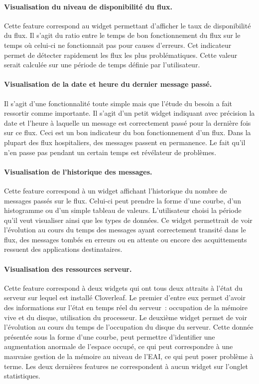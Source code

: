 			\paragraph{Visualisation du niveau de disponibilité du flux.}
			Cette feature correspond au widget permettant d'afficher le taux de
			disponibilité du flux. Il s'agit du ratio entre le temps de bon
			fonctionnement du flux sur le temps où celui-ci ne fonctionnait pas pour
			causes d'erreurs. Cet indicateur permet de détecter rapidement les flux les
			plus problématiques. Cette valeur serait calculée sur une période de temps
			définie par l'utilisateur.
			
			\paragraph{Visualisation de la date et heure du dernier message passé.}
			Il s'agit d'une fonctionnalité toute simple mais que l'étude du besoin a fait
			ressortir comme importante. Il s'agit d'un petit widget indiquant avec
			précision la date et l'heure à laquelle un message est correctement passé
			pour la dernière fois sur ce flux. Ceci est un bon indicateur du bon
			fonctionnement d'un flux. Dans la plupart des flux hospitaliers, des messages
			passent en permanence. Le fait qu'il n'en passe pas pendant un certain temps
			est révélateur de problèmes.
			
			\paragraph{Visualisation de l’historique des messages.}
			Cette feature correspond à un widget affichant l'historique du nombre de
			messages passés sur le flux. Celui-ci peut prendre la forme d'une courbe,
			d'un histogramme ou d'un simple tableau de valeurs. L'utilisateur choisi la
			période qu'il veut visualiser ainsi que les types de données. Ce widget
			permettrait de voir l'évolution au cours du temps des messages ayant
			correctement transité dans le flux, des messages tombés en erreurs ou en
			attente ou encore des acquittements ressuent des applications destinataires.
			
			\paragraph{Visualisation des ressources serveur.}
			Cette feature correspond à deux widgets qui ont tous deux attraits à l'état
			du serveur sur lequel est installé Cloverleaf. Le premier d'entre eux permet
			d'avoir des informations sur l'état en temps réel du serveur~: occupation de
			la mémoire vive et du disque, utilisation du processeur. Le deuxième widget
			permet de voir l'évolution au cours du temps de l'occupation du disque du
			serveur. Cette donnée présentée sous la forme d'une courbe, peut permettre
			d'identifier une augmentation anormale de l'espace occupé, ce qui peut
			correspondre à une mauvaise gestion de la mémoire au niveau de l'EAI, ce qui
			peut poser problème à terme.\newline
			Les deux dernières features ne correspondent à aucun widget sur l'onglet
			statistiques.
			
